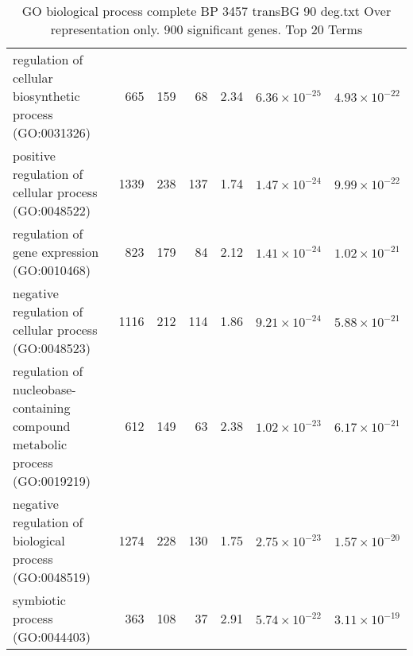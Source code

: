 \begin{table}[ht]
\begin{adjustbox}{width=\textwidth}
\begin{tabular}{lrrrlrr}
  regulation of cellular biosynthetic process (GO:0031326) & 665 & 159 & 68 & 2.34 & $6.36 \times 10^{-25}$ & $4.93 \times 10^{-22}$ \\ 
  positive regulation of cellular process (GO:0048522) & 1339 & 238 & 137 & 1.74 & $1.47 \times 10^{-24}$ & $9.99 \times 10^{-22}$ \\ 
  regulation of gene expression (GO:0010468) & 823 & 179 & 84 & 2.12 & $1.41 \times 10^{-24}$ & $1.02 \times 10^{-21}$ \\ 
  negative regulation of cellular process (GO:0048523) & 1116 & 212 & 114 & 1.86 & $9.21 \times 10^{-24}$ & $5.88 \times 10^{-21}$ \\ 
  regulation of nucleobase-containing compound metabolic process (GO:0019219) & 612 & 149 & 63 & 2.38 & $1.02 \times 10^{-23}$ & $6.17 \times 10^{-21}$ \\ 
  negative regulation of biological process (GO:0048519) & 1274 & 228 & 130 & 1.75 & $2.75 \times 10^{-23}$ & $1.57 \times 10^{-20}$ \\ 
  symbiotic process (GO:0044403) & 363 & 108 & 37 & 2.91 & $5.74 \times 10^{-22}$ & $3.11 \times 10^{-19}$ \\ 
   \hline
\end{tabular}
\end{adjustbox}
\caption{GO biological process complete BP 3457 transBG 90 deg.txt Over representation only. 900 significant genes. Top 20 Terms} 
\label{tab:GO biological process complete BP 3457 transBG 90 deg.txt Over representation only. 900 significant genes. Top 20 Terms}
\end{table}





